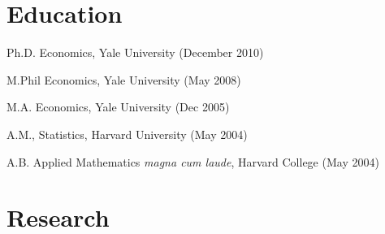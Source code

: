 \documentclass[letterpaper]{article}
\renewenvironment{itemize}{
  \begin{list}{}{
    \setlength{\leftmargin}{1.5em}
  }
}{
  \end{list}
}
\begin{document}
\section*{Education}

\begin{itemize}
\item Ph.D. Economics, Yale University (December 2010)
\item M.Phil Economics, Yale University (May 2008)
\item M.A. Economics, Yale University (Dec 2005)
\item A.M., Statistics, Harvard University (May 2004)
\item A.B. Applied Mathematics \textit{magna cum laude}, Harvard College (May 2004)

\end{itemize}



\section*{Research}
\end{document}
